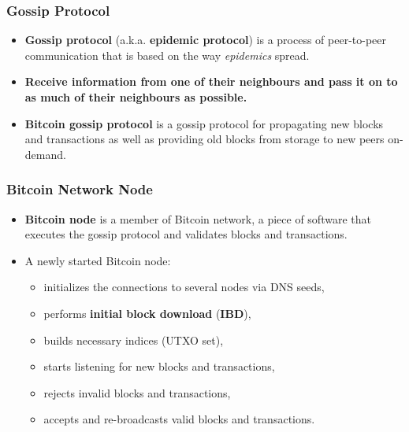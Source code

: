\documentclass{beamer}
\begin{document}
\begin{frame}
  \frametitle{Gossip Protocol}
  \begin{itemize}
  \item \textbf{Gossip protocol} (a.k.a. \textbf{epidemic protocol}) is a
    process of peer-to-peer communication that is based on the way
    \textit{epidemics} spread.
  \item \textbf{Receive information from one of their neighbours and pass it on
      to as much of their neighbours as possible.}
  \item \textbf{Bitcoin gossip protocol} is a gossip protocol for propagating
    new blocks and transactions as well as providing old blocks from storage to
    new peers on-demand.
  \end{itemize}
  \begin{center}
  \end{center}
\end{frame}

\begin{frame}
  \frametitle{Bitcoin Network Node}
  \begin{itemize}
  \item \textbf{Bitcoin node} is a member of Bitcoin network, a piece of
    software that executes the gossip protocol and validates blocks and
    transactions.
  \item A newly started Bitcoin node:
    \begin{itemize}
    \item initializes the connections to several nodes via DNS seeds,
    \item performs \textbf{initial block download} (\textbf{IBD}),
    \item builds necessary indices (UTXO set),
    \item starts listening for new blocks and transactions,
    \item rejects invalid blocks and transactions,
    \item accepts and re-broadcasts valid blocks and transactions.
    \end{itemize}
  \end{itemize}
\end{frame}
\end{document}
